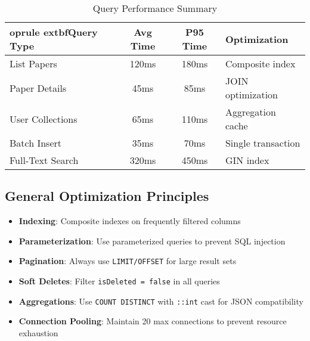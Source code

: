 \begin{table}[H]
\centering
\begin{tabular}{@{}lccl@{}}
	oprule
	extbf{Query Type} & \textbf{Avg Time} & \textbf{P95 Time} & \textbf{Optimization} \\
\midrule
List Papers & 120ms & 180ms & Composite index \\
Paper Details & 45ms & 85ms & JOIN optimization \\
User Collections & 65ms & 110ms & Aggregation cache \\
Batch Insert & 35ms & 70ms & Single transaction \\
Full-Text Search & 320ms & 450ms & GIN index \\
\bottomrule
\end{tabular}
\caption{Query Performance Summary}
\label{tab:query-summary}
\end{table}

\subsection{General Optimization Principles}
\begin{itemize}[leftmargin=*,topsep=3pt,itemsep=2pt]
    \item \textbf{Indexing}: Composite indexes on frequently filtered columns
    \item \textbf{Parameterization}: Use parameterized queries to prevent SQL injection
    \item \textbf{Pagination}: Always use \texttt{LIMIT/OFFSET} for large result sets
    \item \textbf{Soft Deletes}: Filter \texttt{isDeleted = false} in all queries
    \item \textbf{Aggregations}: Use \texttt{COUNT DISTINCT} with \texttt{::int} cast for JSON compatibility
    \item \textbf{Connection Pooling}: Maintain 20 max connections to prevent resource exhaustion
\end{itemize}
